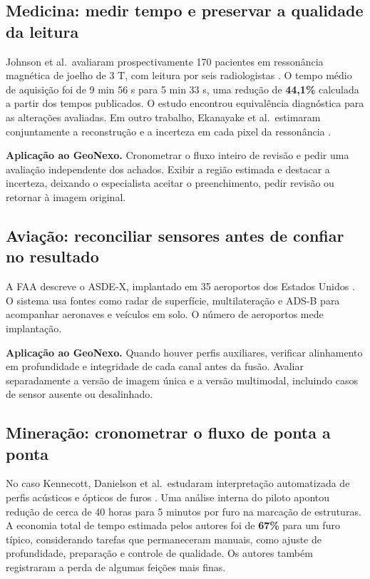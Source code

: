 \documentclass[11pt,a4paper]{article}
\begin{document}
\subsection{Medicina: medir tempo e preservar a qualidade da leitura}

Johnson et al.\ avaliaram prospectivamente 170 pacientes em ressonância magnética de joelho de 3 T, com leitura por seis radiologistas \cite{mri}. O tempo médio de aquisição foi de 9 min 56 s para 5 min 33 s, uma redução de \textbf{44,1\%} calculada a partir dos tempos publicados. O estudo encontrou equivalência diagnóstica para as alterações avaliadas. Em outro trabalho, Ekanayake et al.\ estimaram conjuntamente a reconstrução e a incerteza em cada pixel da ressonância \cite{pixcue}.

\textbf{Aplicação ao GeoNexo.} Cronometrar o fluxo inteiro de revisão e pedir uma avaliação independente dos achados. Exibir a região estimada e destacar a incerteza, deixando o especialista aceitar o preenchimento, pedir revisão ou retornar à imagem original.

\subsection{Aviação: reconciliar sensores antes de confiar no resultado}

A FAA descreve o ASDE-X, implantado em 35 aeroportos dos Estados Unidos \cite{faa}. O sistema usa fontes como radar de superfície, multilateração e ADS-B para acompanhar aeronaves e veículos em solo. O número de aeroportos mede implantação.

\textbf{Aplicação ao GeoNexo.} Quando houver perfis auxiliares, verificar alinhamento em profundidade e integridade de cada canal antes da fusão. Avaliar separadamente a versão de imagem única e a versão multimodal, incluindo casos de sensor ausente ou desalinhado.

\subsection{Mineração: cronometrar o fluxo de ponta a ponta}

No caso Kennecott, Danielson et al.\ estudaram interpretação automatizada de perfis acústicos e ópticos de furos \cite{kennecott}. Uma análise interna do piloto apontou redução de cerca de 40 horas para 5 minutos por furo na marcação de estruturas. A economia total de tempo estimada pelos autores foi de \textbf{67\%} para um furo típico, considerando tarefas que permaneceram manuais, como ajuste de profundidade, preparação e controle de qualidade. Os autores também registraram a perda de algumas feições mais finas.
\end{document}
